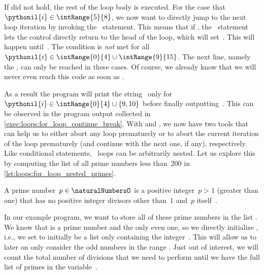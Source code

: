 If  did not hold, the rest of the loop body is executed.
For the case that $\pythonil{i}\in\intRange{5}{8}$, we now want to directly jump to the next loop iteration by invoking the ~statement.
This means that if , the ~statement lets the control directly return to the head of the loop, which will set~.
This will happen until~.
The condition  is \emph{not} met for all $\pythonil{i}\in\intRange{0}{4}\cup\intRange{9}{15}$.
The next line, namely the , can only be reached in these cases.
Of course, we already know that we will never even reach this code as soon as .

As a result the program will print the string~ only for~$\pythonil{i}\in\intRange{0}{4}\cup\{9, 10\}$ before finally outputting~.
This can be observed in the program output collected in \cref{exec:loops:for_loop_continue_break}.
With  and , we now have two tools that can help us to either abort any loop prematurely or to abort the current iteration of the loop prematurely (and continue with the next one, if any), respectively.%
%
\FloatBarrier%
\endhsection%
%
%
%
%
%
%
Like conditional statements, ~loops can be arbitrarily nested.
Let us explore this by computing the list of all prime numbers less than~200 in \cref{lst:loops:for_loop_nested_primes}.%
%
\begin{definition}%
A prime number~$p\in\naturalNumbersO$ is a positive integer~$p>1$ (greater than one) that has no positive integer divisors other than~$1$ and~$p$ itself~\cite{W2024MAWWR:PN,CP2005PNACP,R1994PNACMFF}.%
\end{definition}%
%
In our example program, we want to store all of these prime numbers in the list .
We know that  is a prime number and the only even one, so we directly initialize , i.e., we set  to initially be a list only containing the integer~.
This will allow us to later on only consider the odd numbers in the range .
Just out of interest, we will count the total number of divisions that we need to perform until we have the full list of primes in the variable~.%
